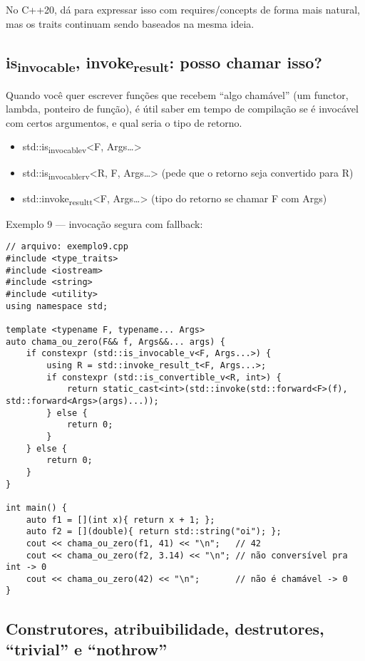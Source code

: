 \documentclass[11pt]{article}
\begin{document}
No C++20, dá para expressar isso com requires/concepts de forma mais natural, mas os traits continuam sendo baseados na mesma ideia.
\subsection{is\textsubscript{invocable}, invoke\textsubscript{result}: posso chamar isso?}
\label{sec:org4a87597}

Quando você quer escrever funções que recebem “algo chamável” (um functor, lambda, ponteiro de função), é útil saber em tempo de compilação se é invocável com certos argumentos, e qual seria o tipo de retorno.
\begin{itemize}
\item std::is\textsubscript{invocable}\textsubscript{v}<F, Args\ldots{}>
\item std::is\textsubscript{invocable}\textsubscript{r}\textsubscript{v}<R, F, Args\ldots{}> (pede que o retorno seja convertido para R)
\item std::invoke\textsubscript{result}\textsubscript{t}<F, Args\ldots{}> (tipo do retorno se chamar F com Args)
\end{itemize}

Exemplo 9 — invocação segura com fallback:
\begin{verbatim}
// arquivo: exemplo9.cpp
#include <type_traits>
#include <iostream>
#include <string>
#include <utility>
using namespace std;

template <typename F, typename... Args>
auto chama_ou_zero(F&& f, Args&&... args) {
    if constexpr (std::is_invocable_v<F, Args...>) {
        using R = std::invoke_result_t<F, Args...>;
        if constexpr (std::is_convertible_v<R, int>) {
            return static_cast<int>(std::invoke(std::forward<F>(f), std::forward<Args>(args)...));
        } else {
            return 0;
        }
    } else {
        return 0;
    }
}

int main() {
    auto f1 = [](int x){ return x + 1; };
    auto f2 = [](double){ return std::string("oi"); };
    cout << chama_ou_zero(f1, 41) << "\n";   // 42
    cout << chama_ou_zero(f2, 3.14) << "\n"; // não conversível pra int -> 0
    cout << chama_ou_zero(42) << "\n";       // não é chamável -> 0
}
\end{verbatim}
\subsection{Construtores, atribuibilidade, destrutores, “trivial” e “nothrow”}
\label{sec:orgd4f8007}
\end{document}
